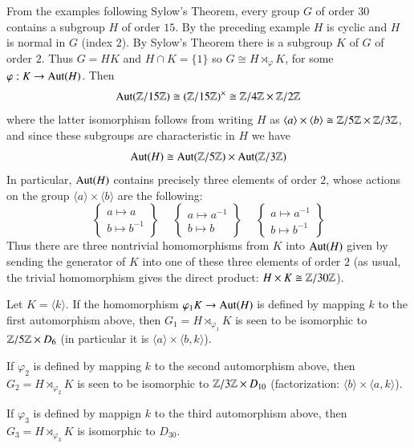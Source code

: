 \documentclass[12pt, a4paper, oneside, openright, titlepage]{book}
\begin{document}
\begin{eg}
    From the examples following Sylow's Theorem, every group $G$ of order $30$ contains a subgroup $H$ of order $15$. By the preceding example $H$ is cyclic and $H$ is normal in $G$ (index $2$). By Sylow's Theorem there is a subgroup $K$ of $G$ of order $2$. Thus $G = HK$ and $H\cap K = \{1\}$ so $G \cong H\rtimes_{\varphi}K$, for some $\varphi:K\rightarrow \operatorname{Aut}(H)$. Then \begin{equation*}
        \operatorname{Aut}(\mathbb Z/15\mathbb Z) \cong (\mathbb Z/15\mathbb Z)^{\times} \cong \mathbb Z/4\mathbb Z\times \mathbb Z/2\mathbb Z
    \end{equation*}
    where the latter isomorphism follows from writing $H$ as $\langle a \rangle \times \langle b \rangle \cong \mathbb Z/5\mathbb Z\times \mathbb Z/3\mathbb Z$, and since these subgroups are characteristic in $H$ we have \begin{equation*}
        \operatorname{Aut}(H) \cong \operatorname{Aut}(\mathbb Z/5\mathbb Z)\times \operatorname{Aut}(\mathbb Z/3\mathbb Z)
    \end{equation*}
    In particular, $\operatorname{Aut}(H)$ contains precisely three elements of order $2$, whose actions on the group $\langle a \rangle \times \langle b \rangle$ are the following: \begin{equation*}
        \left\{\begin{array}{c}a\mapsto a \\ b \mapsto b^{-1}\end{array}\right\}\hspace{15pt} \left\{\begin{array}{c}a\mapsto a^{-1} \\ b \mapsto b \end{array}\right\}\hspace{15pt}\left\{\begin{array}{c}a\mapsto a^{-1} \\ b \mapsto b^{-1}\end{array}\right\}
    \end{equation*}
    Thus there are three nontrivial homomorphisms from $K$ into $\operatorname{Aut}(H)$ given by sending the generator of $K$ into one of these three elements of order $2$ (as usual, the trivial homomorphism gives the direct product: $H\times K \cong \mathbb Z/30\mathbb Z$).

    Let $K = \langle k \rangle$. If the homomorphism $\varphi_1K\rightarrow \operatorname{Aut}(H)$ is defined by mapping $k$ to the first automorphism above, then $G_1 = H\rtimes_{\varphi_1}K$ is seen to be isomorphic to $\mathbb Z/5\mathbb Z\times D_6$ (in particular it is $\langle a \rangle \times \langle b,k\rangle$).

    If $\varphi_2$ is defined by mapping $k$ to the second automorphism above, then $G_2 = H\rtimes_{\varphi_2}K$ is seen to be isomorphic to $\mathbb Z/3\mathbb Z\times D_{10}$ (factorization: $\langle b \rangle \times \langle a,k\rangle$).

    If $\varphi_3$ is defined by mappign $k$ to the third automorphism above, then $G_3=H\rtimes_{\varphi_3}K$ is isomorphic to $D_{30}$.
\end{eg}
\end{document}
